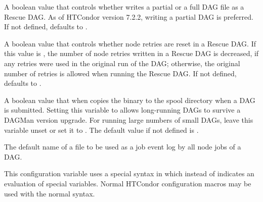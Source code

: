 \begin{description}
\label{param:DAGManWritePartialRescue}
\item[\Macro{DAGMAN\_WRITE\_PARTIAL\_RESCUE}]
  A boolean value that controls whether  writes a partial
  or a full DAG file as a Rescue DAG.  
  As of HTCondor version 7.2.2, writing a partial DAG is preferred.
  If not defined,  defaults to
  .

\label{param:DAGManResetRetriesUponRescue}
\item[\Macro{DAGMAN\_RESET\_RETRIES\_UPON\_RESCUE}]
  A boolean value that controls whether node retries are reset in a Rescue
  DAG.  If this value is , the number of node retries written
  in a Rescue DAG is decreased,
  if any retries were used in the original run of the DAG; 
  otherwise, the original number of retries is allowed
  when running the Rescue DAG.
  If not defined,  defaults to
  .

\label{param:DAGManCopyToSpool}
\item[\Macro{DAGMAN\_COPY\_TO\_SPOOL}]
  A boolean value that when  copies the  binary
  to the spool directory when a DAG is submitted.
  Setting this variable to  allows
  long-running DAGs to survive a DAGMan version upgrade.
  For running large numbers of small DAGs, leave this
  variable unset or set it to .
  The default value if not defined is .

\label{param:DAGManDefaultNodeLog}
\item[\Macro{DAGMAN\_DEFAULT\_NODE\_LOG}]
  The default name of a file to be used as a job event log by all node jobs
  of a DAG.

  This configuration variable uses a special syntax 
  in which  instead of \Bold{\Expr{\$}} indicates
  an evaluation of special variables.  
  Normal HTCondor configuration macros may be used with the normal
  \Bold{\Expr{\$}} syntax.


\end{description}
